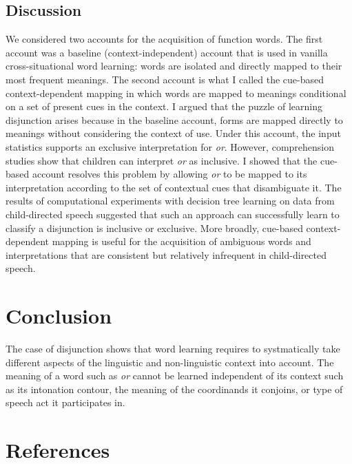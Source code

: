 \documentclass[,man,floatsintext]{apa6}
\begin{document}
\hypertarget{discussion}{%
\subsection{Discussion}\label{discussion}}

We considered two accounts for the acquisition of function words. The first account was a baseline (context-independent) account that is used in vanilla cross-situational word learning: words are isolated and directly mapped to their most frequent meanings. The second account is what I called the cue-based context-dependent mapping in which words are mapped to meanings conditional on a set of present cues in the context. I argued that the puzzle of learning disjunction arises because in the baseline account, forms are mapped directly to meanings without considering the context of use. Under this account, the input statistics supports an exclusive interpretation for \emph{or}. However, comprehension studies show that children can interpret \emph{or} as inclusive. I showed that the cue-based account resolves this problem by allowing \emph{or} to be mapped to its interpretation according to the set of contextual cues that disambiguate it. The results of computational experiments with decision tree learning on data from child-directed speech suggested that such an approach can successfully learn to classify a disjunction is inclusive or exclusive. More broadly, cue-based context-dependent mapping is useful for the acquisition of ambiguous words and interpretations that are consistent but relatively infrequent in child-directed speech.

\hypertarget{conclusion-1}{%
\section{Conclusion}\label{conclusion-1}}

The case of disjunction shows that word learning requires to systmatically take different aspects of the linguistic and non-linguistic context into account. The meaning of a word such as \emph{or} cannot be learned independent of its context such as its intonation contour, the meaning of the coordinands it conjoins, or type of speech act it participates in.

\newpage

\hypertarget{references}{%
\section{References}\label{references}}
\end{document}
